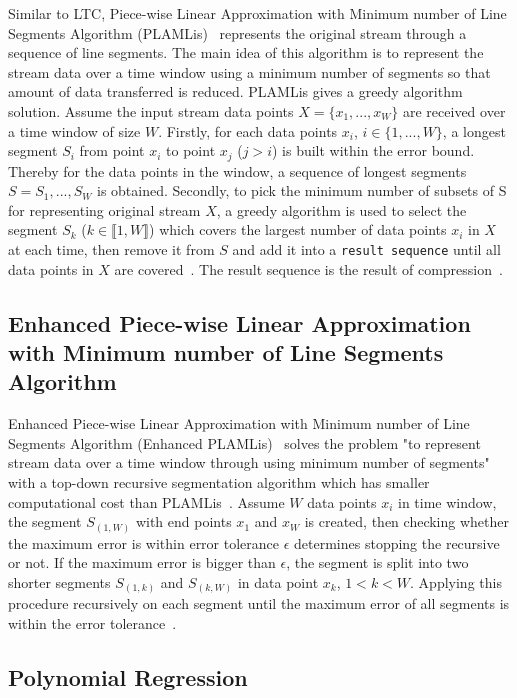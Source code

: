 Similar to LTC, Piece-wise Linear Approximation with Minimum number of Line
Segments Algorithm (PLAMLis)~\cite{liu2007energy} represents the original stream
through a sequence of line segments. The main idea of this algorithm is to
represent the stream data over a time window using a minimum number of segments
so that amount of data transferred is reduced. PLAMLis gives a greedy algorithm
solution. Assume the input stream data points $X=\{x_1, ..., x_W\}$ are received
over a time window of size $W$. Firstly, for each data points $x_i$, $i \in 
\{1, ..., W\}$, a longest segment $S_{i}$ from point $x_i$ to point $x_j$
($j>i$) is built within the error bound. Thereby for the data points in the
window, a sequence of longest segments $S = {S_1, ..., S_W}$ is obtained.
Secondly, to pick the minimum number of subsets of S for representing original
stream $X$, a greedy algorithm is used to select the segment $S_k$ ($k \in
\llbracket1, W\rrbracket$) which covers the largest number of data points $x_i$
in $X$ at each time, then remove it from $S$ and add it into a \texttt{result
sequence} until all data points in $X$ are covered~\cite{liu2007energy}. The
result sequence is the result of compression~\cite{zordan2012compress,
zordan2014performance}.


\subsection{Enhanced Piece-wise Linear Approximation with Minimum number of Line
Segments Algorithm} 

Enhanced Piece-wise Linear Approximation with Minimum number of Line Segments
Algorithm (Enhanced PLAMLis)~\cite{pham2008enhance} solves the problem "to
represent stream data over a time window through using minimum number of
segments" with a top-down recursive segmentation algorithm which has smaller
computational cost than PLAMLis~\cite{pham2008enhance, zordan2014performance}.
Assume $W$ data points $x_i$ in time window, the segment $S_{(1, W)}$ with end
points $x_1$ and $x_W$ is created, then checking whether the maximum error is
within error tolerance $\epsilon$ determines stopping the recursive or not. If
the maximum error is bigger than $\epsilon$, the segment is split into two
shorter segments $S_{(1, k)}$ and $S_{(k, W)}$ in data point $x_k$, $1<k<W$.
Applying this procedure recursively on each segment until the maximum error of
all segments is within the error tolerance~\cite{pham2008enhance,
zordan2014performance}. 

\subsection{Polynomial Regression}
\label{sec:polynomial}

